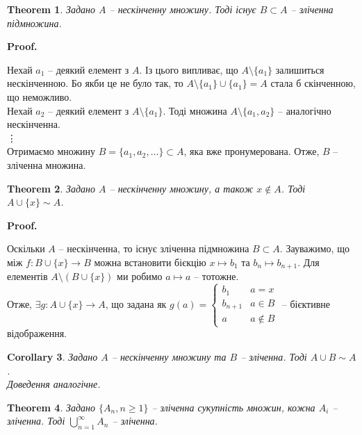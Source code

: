 \documentclass[a4paper, 14pt]{extarticle}
\makeatletter
\theoremstyle{theoremdd}
\newtheorem{theorem}{Theorem}[subsection]
\theoremstyle{theoremdd}
\theoremstyle{theoremdd}
\theoremstyle{theoremdd}
\theoremstyle{theoremdd}
\theoremstyle{theoremdd}
\theoremstyle{theoremdd}
\theoremstyle{theoremdd}
\theoremstyle{theoremdd}
\theoremstyle{theoremdd}
\theoremstyle{theoremdd}
\theoremstyle{theoremdd}
\theoremstyle{theoremdd}
\theoremstyle{theoremdd}
\newtheorem{corollary}[theorem]{Corollary}
\theoremstyle{theoremdd}
\renewenvironment{proof}[1][Proof.\\]{\par
\pushQED{\hfill \qed}%
\normalfont \topsep6\p@\@plus6\p@\relax
\trivlist
\item\relax
{\bfseries
#1\@addpunct{.}}\hspace\labelsep\ignorespaces
}{%
\popQED\endtrivlist\@endpefalse
}
\makeatother
\begin{document}
\begin{theorem}
Задано $A$ -- нескінченну множину. Тоді існує $B \subset A$ -- зліченна підмножина.
\end{theorem}

\begin{proof}
Нехай $a_1$ -- деякий елемент з $A$. Із цього випливає, що $A \setminus \{a_1\}$ залишиться нескінченною. Бо якби це не було так, то $A \setminus \{a_1\} \cup \{a_1\} = A$ стала б скінченною, що неможливо.\\
Нехай $a_2$ -- деякий елемент з $A \setminus \{a_1\}$. Тоді множина $A \setminus \{a_1,a_2\}$ -- аналогічно нескінченна.\\
\vdots \\
Отримаємо множину $B = \{a_1,a_2,\dots\} \subset A$, яка вже пронумерована. Отже, $B$ -- зліченна множина.
\end{proof}

\begin{theorem}
Задано $A$ -- нескінченну множину, а також $x \notin A$. Тоді $A \cup \{x\} \sim A$.
\end{theorem}

\begin{proof}
Оскільки $A$ -- нескінченна, то існує зліченна підмножина $B \subset A$. Зауважимо, що між $f \colon B \cup \{x\} \to B$ можна встановити бієкцію $x \mapsto b_1$ та $b_{n} \mapsto b_{n+1}$. Для елементів $A \setminus (B \cup \{x\})$ ми робимо $a \mapsto a$ -- тотожне.\\
Отже, $\exists g \colon A \cup \{x\} \to A$, що задана як $g(a) = \begin{cases} b_1 & a = x \\ b_{n+1} & a \in B \\ a & a \notin B \end{cases}$ -- бієктивне відображення.
\end{proof}

\begin{corollary}
Задано $A$ -- нескінченну множину та $B$ -- зліченна. Тоді $A \cup B \sim A$.\\
\textit{Доведення аналогічне.}
\end{corollary}

\begin{theorem}
Задано $\{A_n, n \geq 1\}$ -- зліченна сукупність множин, кожна $A_i$ -- зліченна. Тоді $\displaystyle\bigcup_{n = 1}^\infty A_n$ -- зліченна.
\end{theorem}
\end{document}
